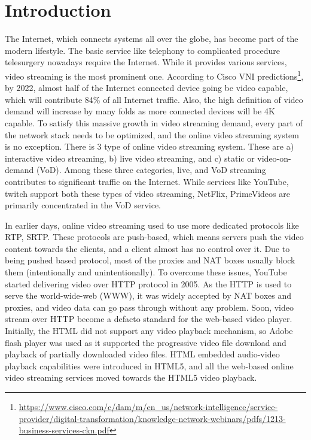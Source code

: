 \section{Introduction}
The Internet, which connects systems all over the globe, has become part of the modern lifestyle. The basic service like telephony to complicated procedure telesurgery nowadays require the Internet. While it provides various services, video streaming is the most prominent one. According to Cisco VNI predictions\footnote{\url{https://www.cisco.com/c/dam/m/en_us/network-intelligence/service-provider/digital-transformation/knowledge-network-webinars/pdfs/1213-business-services-ckn.pdf}}, by 2022, almost half of the Internet connected device going be video capable, which will contribute 84\% of all Internet traffic. Also, the high definition of video demand will increase by many folds as more connected devices will be 4K capable. To satisfy this massive growth in video streaming demand, every part of the network stack needs to be optimized, and the online video streaming system is no exception. There is 3 type of online video streaming system. These are a) interactive video streaming, b) live video streaming, and c) static or video-on-demand (VoD). Among these three categories, live, and VoD streaming contributes to significant traffic on the Internet. While services like YouTube, twitch support both these types of video streaming, NetFlix, PrimeVideos are primarily concentrated in the VoD service.

In earlier days, online video streaming used to use more dedicated protocols like RTP, SRTP. These protocols are push-based, which means servers push the video content towards the clients, and a client almost has no control over it. Due to being pushed based protocol, most of the proxies and NAT boxes usually block them (intentionally and unintentionally). To overcome these issues, YouTube started delivering video over HTTP protocol in 2005. As the HTTP is used to serve the world-wide-web (WWW), it was widely accepted by NAT boxes and proxies, and video data can go pass through without any problem. Soon, video stream over HTTP become a defacto standard for the web-based video player. Initially, the HTML did not support any video playback mechanism, so Adobe flash player was used as it supported the progressive video file download and playback of partially downloaded video files\cite{gill2007youtube}. HTML embedded audio-video playback capabilities were introduced in HTML5, and all the web-based online video streaming services moved towards the HTML5 video playback.

